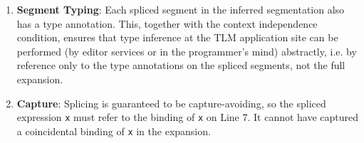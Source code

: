 \documentclass[acmsmall,screen]{acmart}
\newcommand{\li}[1]{\lstinline[basicstyle=\ttfamily\fontsize{9pt}{1em}\selectfont]{#1}}
\begin{document}
\begin{enumerate}[leftmargin=12pt]
\item \textbf{Segment Typing}: Each spliced segment in the inferred segmentation also has  a type annotation. This, together with the context independence condition, ensures that type inference at the TLM application site can be performed (by editor services or in the programmer's mind) abstractly, i.e. by reference only to the type annotations on the spliced segments, not the full expansion.  %
\item \textbf{Capture}: Splicing is guaranteed to be capture-avoiding, so the spliced expression \li{x} must refer to the binding of \li{x} on Line 7. It cannot have captured a coincidental binding of \li{x} in the expansion. %
\end{enumerate}


\end{document}
